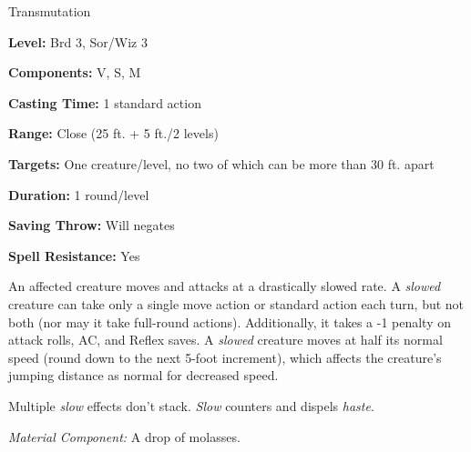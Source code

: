 
Transmutation

\textbf{Level:} Brd 3, Sor/Wiz 3

\textbf{Components:} V, S, M

\textbf{Casting Time:} 1 standard action

\textbf{Range:} Close (25 ft. + 5 ft./2 levels)

\textbf{Targets:} One creature/level, no two of which can be more than 30 ft. apart

\textbf{Duration:} 1 round/level

\textbf{Saving Throw:} Will negates

\textbf{Spell Resistance:} Yes

An affected creature moves and attacks at a drastically slowed rate. A \textit{slowed 
}creature can take only a single move action or standard action each turn, but 
not both (nor may it take full-round actions). Additionally, it takes a -1 penalty 
on attack rolls, AC, and Reflex saves. A \textit{slowed} creature moves at half 
its normal speed (round down to the next 5-foot increment), which affects the creature's 
jumping distance as normal for decreased speed.

Multiple \textit{slow} effects don't stack. \textit{Slow} counters and dispels 
\textit{haste}.

\textit{Material Component:} A drop of molasses.

